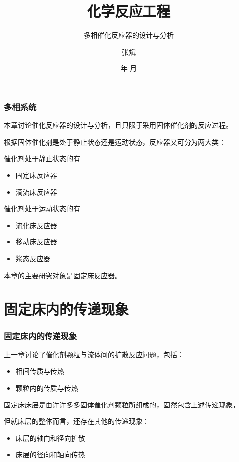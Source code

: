 \documentclass[dvipsnames, svgnames, x11names]{beamer}
\title{化学反应工程}
\subtitle{多相催化反应器的设计与分析}
\author{张斌}
\institute[理工系]{河北农业大学 理工系}
\date{\the\year 年 \the\month 月}
\begin{document}
\maketitle




    \begin{frame}
        \frametitle{多相系统}
    
        本章讨论催化反应器的设计与分析，且只限于采用固体催化剂的反应过程。
        
        根据固体催化剂是处于静止状态还是运动状态，反应器又可分为两大类：
        
        催化剂处于静止状态的有
        \begin{itemize}
            \item 固定床反应器
            \item 滴流床反应器
        \end{itemize}

        催化剂处于运动状态的有
        \begin{itemize}
            \item 流化床反应器
            \item 移动床反应器
            \item 浆态反应器
        \end{itemize}
        
        本章的主要研究对象是固定床反应器。
        
    
    \end{frame}
	


	\begin{frame}{}
        \begin{center}
            {\Huge {}}
        \end{center}
		\tableofcontents
		\thispagestyle{empty}
	\end{frame}


\section{固定床内的传递现象}


\begin{frame}
    \frametitle{固定床内的传递现象}

    上一章讨论了催化剂颗粒与流体间的扩散反应问题，包括：
    \begin{itemize}
        \item 相间传质与传热
        \item 颗粒内的传质与传热
    \end{itemize}

    固定床床层是由许许多多固体催化剂颗粒所组成的，固然包含上述传递现象，
    
    但就床层的整体而言，还存在其他的传递现象：
    \begin{itemize}
        \item 床层的轴向和径向扩散
        \item 床层的径向和轴向传热
    \end{itemize}

\end{frame}
\end{document}

